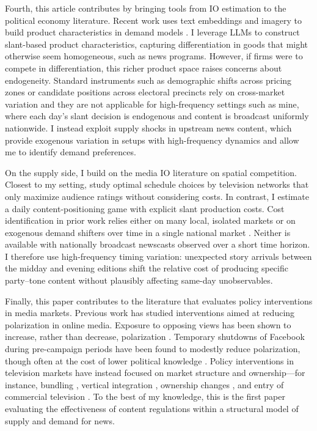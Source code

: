 \documentclass[12pt]{article}
\begin{document}
Fourth, this article contributes by bringing tools from IO estimation to the political economy literature. Recent work uses text embeddings and imagery to build product characteristics in demand models \citep{compiani2025demandestimationtextimage}. I leverage LLMs to construct slant-based product characteristics, capturing differentiation in goods that might otherwise seem homogeneous, such as news programs. However, if firms were to compete in differentiation, this richer product space raises concerns about endogeneity. Standard instruments such as demographic shifts across pricing zones \citep{fan} or candidate positions across electoral precincts \citep{longuet-marx2025party} rely on cross-market variation and they are not applicable for high-frequency settings such as mine,  where each day’s slant decision is endogenous and content is broadcast uniformly nationwide. I instead exploit supply shocks in upstream news content, which provide exogenous variation in setups with high-frequency dynamics and allow me to identify demand preferences. 



On the supply side, I build on the media IO literature on spatial competition. Closest to my setting, \citet{Goettler2001SpatialCI} study optimal schedule choices by television networks that only maximize audience ratings without considering costs. In contrast, I estimate a daily content-positioning game with explicit slant production costs. Cost identification in prior work relies either on many local, isolated markets \citep[e.g.,][]{Draganska2008BeyondPV,fan} or on exogenous demand shifters over time in a single national market \citep{Wollmann2018TrucksWB}. Neither is available with nationally broadcast  newscasts observed over a short time horizon. I therefore use high-frequency timing variation: unexpected story arrivals between the midday and evening editions shift the relative cost of producing specific party–tone content without plausibly affecting same-day unobservables. 


Finally, this paper contributes to the literature that evaluates policy interventions in media markets. Previous work has studied interventions aimed at reducing polarization in online media. Exposure to opposing views has been shown to increase, rather than decrease, polarization \citep{bail2018exposure}. Temporary shutdowns of Facebook during pre-campaign periods have been found to modestly reduce polarization, though often at the cost of lower political knowledge \citep{Allcott2024TheEO}. Policy interventions in television markets have instead focused on market structure and ownership—for instance, bundling \citep{crawford_yurukoglu}, vertical integration \citep{crawford_vertical}, ownership changes \citep{MARTIN_McCRAIN_2019}, and entry of commercial television \citep{prat_stromberg_entry}. To the best of my knowledge, this is the first paper evaluating the effectiveness of content regulations within a structural model of supply and demand for news.
\end{document}
